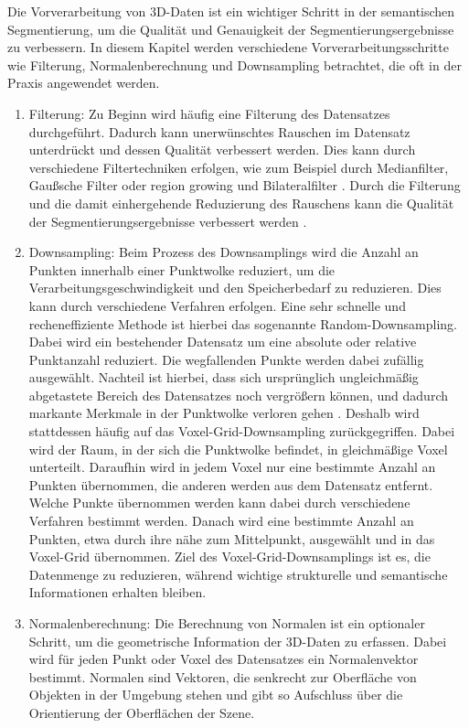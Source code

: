 Die Vorverarbeitung von 3D-Daten ist ein wichtiger Schritt in der semantischen
Segmentierung, um die Qualität und Genauigkeit der Segmentierungsergebnisse zu
verbessern. In diesem Kapitel werden verschiedene Vorverarbeitungsschritte wie
Filterung, Normalenberechnung und Downsampling betrachtet, die oft in der
Praxis angewendet werden.

\begin{enumerate}

\item Filterung: Zu Beginn wird häufig eine Filterung des Datensatzes durchgeführt.
Dadurch kann unerwünschtes Rauschen im Datensatz unterdrückt und dessen
Qualität verbessert werden. Dies kann durch verschiedene Filtertechniken
erfolgen, wie zum Beispiel durch Medianfilter, Gaußsche Filter \cite{9191237}
oder region growing und Bilateralfilter \cite{6460813}. Durch die Filterung und
die damit einhergehende Reduzierung des Rauschens kann die Qualität der
Segmentierungsergebnisse verbessert werden \cite{HAN2017103}.

\item Downsampling: Beim Prozess des Downsamplings wird die Anzahl an Punkten
innerhalb einer Punktwolke reduziert, um die Verarbeitungsgeschwindigkeit und
den Speicherbedarf zu reduzieren. Dies kann durch verschiedene Verfahren
erfolgen. Eine sehr schnelle und recheneffiziente Methode ist hierbei das
sogenannte Random-Downsampling. Dabei wird ein bestehender Datensatz um eine
absolute oder relative Punktanzahl reduziert. Die wegfallenden Punkte werden
dabei zufällig ausgewählt. Nachteil ist hierbei, dass sich ursprünglich
ungleichmäßig abgetastete Bereich des Datensatzes noch vergrößern können, und
dadurch markante Merkmale in der Punktwolke verloren gehen
\cite{987567547,2233445566}. Deshalb wird stattdessen häufig auf das
Voxel-Grid-Downsampling zurückgegriffen. Dabei wird der Raum, in der sich die
Punktwolke befindet, in gleichmäßige Voxel unterteilt. Daraufhin wird in jedem
Voxel nur eine bestimmte Anzahl an Punkten übernommen, die anderen werden aus
dem Datensatz entfernt. Welche Punkte übernommen werden kann dabei durch
verschiedene Verfahren bestimmt werden. Danach wird eine bestimmte Anzahl an
Punkten, etwa durch ihre nähe zum Mittelpunkt, ausgewählt und in das Voxel-Grid
übernommen. Ziel des Voxel-Grid-Downsamplings ist es, die Datenmenge zu
reduzieren, während wichtige strukturelle und semantische Informationen
erhalten bleiben. %

\item Normalenberechnung: Die Berechnung von Normalen ist ein optionaler Schritt, um
die geometrische Information der 3D-Daten zu erfassen. Dabei wird für jeden
Punkt oder Voxel des Datensatzes ein Normalenvektor bestimmt. Normalen sind
Vektoren, die senkrecht zur Oberfläche von Objekten in der Umgebung stehen und
gibt so Aufschluss über die Orientierung der Oberflächen der Szene.
\cite{6375034}

\end{enumerate}

